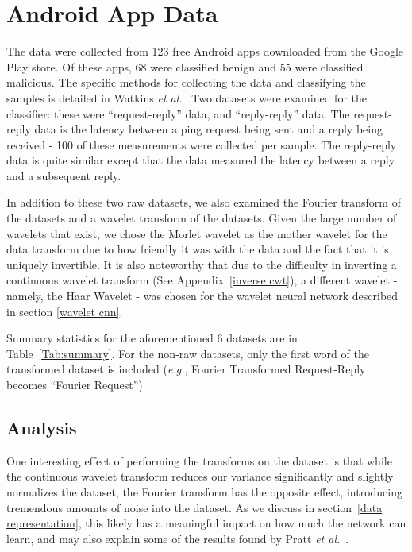 \documentclass[10pt]{article}
\begin{document}
\section{Android App Data}
The data were collected from 123 free Android apps downloaded from the Google Play store. 
Of these apps, 68 were classified benign and 55 were classified malicious.
The specific methods for collecting the data and classifying the samples is detailed in Watkins \textit{et al.}~\cite{watkins2018network}
Two datasets were examined for the classifier: these were ``request-reply'' data, and ``reply-reply'' data.
The request-reply data is the latency between a ping request being sent and a reply being received - 100 of these measurements were collected per sample.
The reply-reply data is quite similar except that the data measured the latency between a reply and a subsequent reply.

In addition to these two raw datasets, we also examined the Fourier transform of the datasets and a wavelet transform of the datasets. 
Given the large number of wavelets that exist, we chose the Morlet wavelet as the mother wavelet for the data transform due to how friendly it was with the data and the fact that it is uniquely invertible.
It is also noteworthy that due to the difficulty in inverting a continuous wavelet transform (See Appendix~\ref{inverse cwt}), a different wavelet - namely, the Haar Wavelet - was chosen for the wavelet neural network described in section \ref{wavelet cnn}.

Summary statistics for the aforementioned 6 datasets are in Table~\ref{Tab:summary}. 
For the non-raw datasets, only the first word of the transformed dataset is included (\textit{e.g.}, Fourier Transformed Request-Reply becomes ``Fourier Request'')

\subsection{Analysis}
One interesting effect of performing the transforms on the dataset is that while the continuous wavelet transform reduces our variance significantly and slightly normalizes the dataset, the Fourier transform has the opposite effect, introducing tremendous amounts of noise into the dataset.
As we discuss in section~\ref{data representation}, this likely has a meaningful impact on how much the network can learn, and may also explain some of the results found by Pratt \textit{et al.}~\cite{pratt2017fcnn}.
\end{document}
